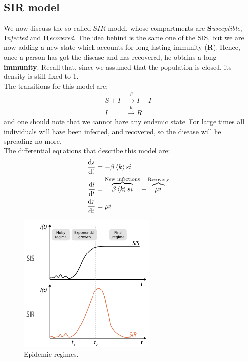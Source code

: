 \documentclass[../main/main.tex]{subfiles}
\begin{document}
\subsection{SIR model}
We now discuss the so called $SIR$ model, whose compartments are \textbf{S}\textit{usceptible}, \textbf{I}\textit{nfected} and \textbf{R}\textit{ecovered}. The idea behind is the same one of the SIS, but we are now adding a new state which accounts for long lasting immunity (\textbf{R}). Hence, once a person has got the disease and has recovered, he obtains a long \textbf{immunity}. Recall that, since we assumed that the population is closed, its density is still fixed to 1.\\
The transitions for this model are:
\begin{equation}
\begin{split}
  S + I &\overset{\beta }{\rightarrow } I + I  \\
  I &\overset{\mu }{\rightarrow } R
\end{split}
\end{equation}
and one should note that we cannot have any endemic state. For large times all individuals will have been infected, and recovered, so the disease will be spreading no more.\\
The differential equations that describe this model are:
\begin{equation}
\begin{split}
  \dv{s}{t} &= - \beta \expval{k} si  \\
  \dv{i}{t} &= \overbrace{\beta \expval{k} si}^{\text{New infections}}  - \overbrace{\mu i}^{\text{Recovery}} \\
  \dv{r}{t} &= \mu i
\end{split}
\end{equation}

\begin{figure}[h!]
\centering
\includegraphics[width=0.6\textwidth]{../lessons/image/03/6.png}
\caption{\label{fig:3_6} Epidemic regimes.}
\end{figure}
\end{document}
